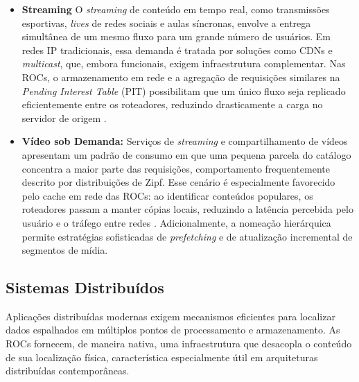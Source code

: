 \documentclass[12pt]{article}
\begin{document}
\begin{itemize}

\item \textbf{Streaming}
O \textit{streaming} de conteúdo em tempo real, como transmissões esportivas, \textit{lives} de redes sociais e aulas síncronas, envolve a entrega simultânea de um mesmo fluxo para um grande número de usuários. Em redes IP tradicionais, essa demanda é tratada por soluções como CDNs e \textit{multicast}, que, embora funcionais, exigem infraestrutura complementar. Nas ROCs, o armazenamento em rede e a agregação de requisições similares na \textit{Pending Interest Table} (PIT) possibilitam que um único fluxo seja replicado eficientemente entre os roteadores, reduzindo drasticamente a carga no servidor de origem \cite{ahlgren2012survey}.

\item \textbf{Vídeo sob Demanda:}
Serviços de \textit{streaming} e compartilhamento de vídeos apresentam um padrão de consumo em que uma pequena parcela do catálogo concentra a maior parte das requisições, comportamento frequentemente descrito por distribuições de Zipf. Esse cenário é especialmente favorecido pelo cache em rede das ROCs: ao identificar conteúdos populares, os roteadores passam a manter cópias locais, reduzindo a latência percebida pelo usuário e o tráfego entre redes \cite{bvm12}. Adicionalmente, a nomeação hierárquica permite estratégias sofisticadas de \textit{prefetching} e de atualização incremental de segmentos de mídia.

\end{itemize}

\subsection{Sistemas Distribuídos}

Aplicações distribuídas modernas exigem mecanismos eficientes para localizar dados espalhados em múltiplos pontos de processamento e armazenamento. As ROCs fornecem, de maneira nativa, uma infraestrutura que desacopla o conteúdo de sua localização física, característica especialmente útil em arquiteturas distribuídas contemporâneas.
\end{document}
